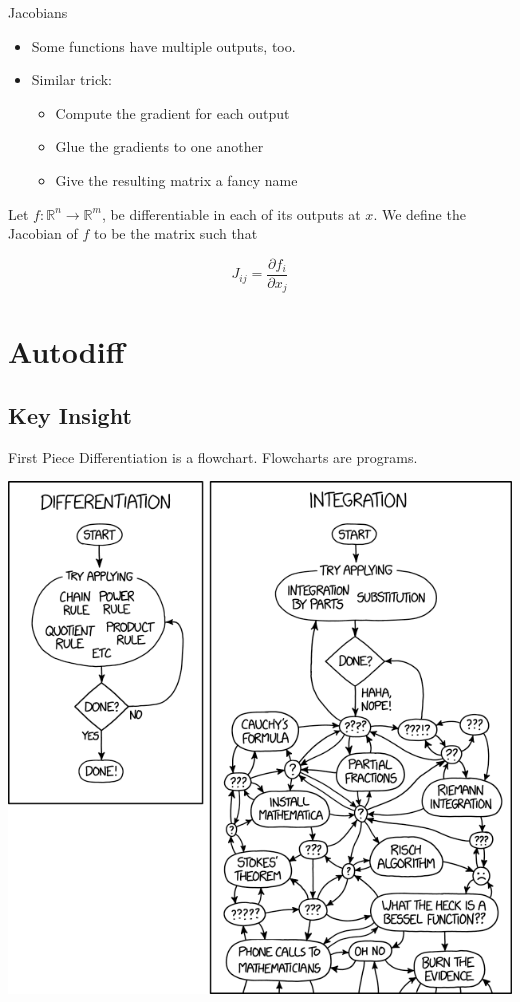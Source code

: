 \documentclass[pdf]{beamer}
\begin{document}
\begin{frame}{Jacobians}
  \begin{itemize}
  \item Some functions have multiple outputs, too.
  \item Similar trick:
    \begin{itemize}
    \item Compute the gradient for each output
    \item Glue the gradients to one another
    \item Give the resulting matrix a fancy name
    \end{itemize}
  \end{itemize}
  \pause
  \begin{definition}
    Let $f:\mathbb{R}^n\rightarrow\mathbb{R}^m$, be differentiable in each of its outputs at $x$. We define the Jacobian of $f$ to be the matrix such that

    \[ J_{ij} = \frac{\partial f_i}{\partial x_j} \]
  \end{definition}
\end{frame}

\section{Autodiff}
\subsection{Key Insight}
\begin{frame}{First Piece}
  Differentiation is a flowchart. Flowcharts are programs.
  \begin{center}
    \includegraphics[scale=0.25]{xkcd_differentiation_and_integration.png}
  \end{center}
\end{frame}
\end{document}
